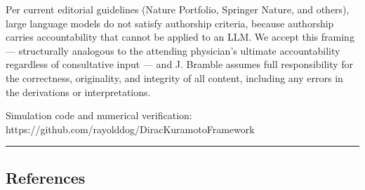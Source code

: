 \documentclass[
]{article}
\begin{document}
Per current editorial guidelines (Nature Portfolio, Springer Nature, and
others), large language models do not satisfy authorship criteria,
because authorship carries accountability that cannot be applied to an
LLM. We accept this framing --- structurally analogous to the attending
physician's ultimate accountability regardless of consultative input ---
and J. Bramble assumes full responsibility for the correctness,
originality, and integrity of all content, including any errors in the
derivations or interpretations.

Simulation code and numerical verification:
https://github.com/rayolddog/DiracKuramotoFramework

\begin{center}\rule{0.5\linewidth}{0.5pt}\end{center}

\subsection{References}\label{references}
\end{document}
